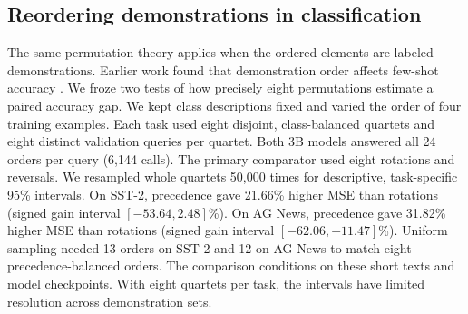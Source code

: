 \subsection{Reordering demonstrations in classification}
The same permutation theory applies when the ordered elements are labeled demonstrations. Earlier work found that demonstration order affects few-shot accuracy \citep{ludemos}. We froze two tests of how precisely eight permutations estimate a paired accuracy gap. We kept class descriptions fixed and varied the order of four training examples. Each task used eight disjoint, class-balanced quartets and eight distinct validation queries per quartet. Both 3B models answered all 24 orders per query (6,144 calls). The primary comparator used eight rotations and reversals. We resampled whole quartets 50,000 times for descriptive, task-specific 95\% intervals.
 On SST-2, precedence gave 21.66\% higher MSE than rotations (signed gain interval $[-53.64,2.48]$\%). On AG News, precedence gave 31.82\% higher MSE than rotations (signed gain interval $[-62.06,-11.47]$\%). Uniform sampling needed 13 orders on SST-2 and 12 on AG News to match eight precedence-balanced orders. The comparison conditions on these short texts and model checkpoints. With eight quartets per task, the intervals have limited resolution across demonstration sets.

